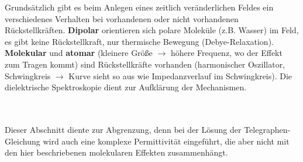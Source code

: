  \begin{minipage}{0.6\textwidth}
 	Grundsätzlich gibt es beim Anlegen eines zeitlich veränderlichen Feldes ein verschiedenes Verhalten bei vorhandenen oder nicht
 	vorhandenen Rückstellkräften. \textbf{Dipolar} orientieren sich polare Moleküle (z.B.
 	Wasser) im Feld, es gibt keine Rückstellkraft, nur thermische Bewegung (Debye-Relaxation).
 	\textbf{Molekular} und \textbf{atomar} (kleinere Größe $\to$ höhere Frequenz, wo der Effekt zum Tragen kommt) sind Rückstellkräfte vorhanden (harmonischer Oszillator, Schwingkreis $\to$ Kurve sieht so aus wie Impedanzverlauf im Schwingkreis).
 	Die dielektrische Spektroskopie dient zur Aufklärung der Mechanismen.
 \end{minipage}\\\\
 Dieser Abschnitt diente zur Abgrenzung, denn bei der Lösung der Telegraphen-Gleichung wird auch eine komplexe Permittivität eingeführt, die aber nicht mit den hier beschriebenen molekularen Effekten zusammenhängt.
